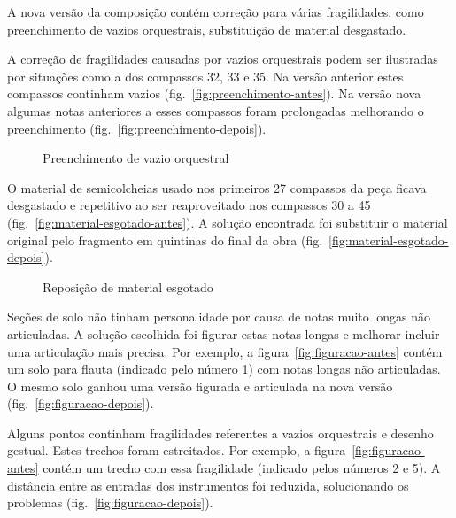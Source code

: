 \documentclass[10pt]{article}
\begin{document}
A nova versão da composição contém correção para várias fragilidades,
como preenchimento de vazios orquestrais, substituição de material
desgastado.

A correção de fragilidades causadas por vazios orquestrais podem ser
ilustradas por situações como a dos compassos 32, 33 e 35. Na versão
anterior estes compassos continham vazios
(fig.~\ref{fig:preenchimento-antes}). Na versão nova algumas notas
anteriores a esses compassos foram prolongadas melhorando o
preenchimento (fig.~\ref{fig:preenchimento-depois}).

\begin{figure*}
  \centering

  \caption{Preenchimento de vazio orquestral}
  \label{fig:preenchimento-vazio-orquestral}
\end{figure*}

O material de semicolcheias usado nos primeiros 27 compassos da peça
ficava desgastado e repetitivo ao ser reaproveitado nos compassos 30 a
45 (fig.~\ref{fig:material-esgotado-antes}). A solução encontrada foi
substituir o material original pelo fragmento em quintinas do final da
obra (fig.~\ref{fig:material-esgotado-depois}).

\begin{figure*}
  \centering

  \caption{Reposição de material esgotado}
  \label{fig:reposicao-material-esgotado}
\end{figure*}

Seções de solo não tinham personalidade por causa de notas muito
longas não articuladas. A solução escolhida foi figurar estas notas
longas e melhorar incluir uma articulação mais precisa. Por exemplo, a
figura~\ref{fig:figuracao-antes} contém um solo para flauta (indicado
pelo número 1) com notas longas não articuladas. O mesmo solo ganhou
uma versão figurada e articulada na nova versão
(fig.~\ref{fig:figuracao-depois}).

Alguns pontos continham fragilidades referentes a vazios orquestrais e
desenho gestual. Estes trechos foram estreitados. Por exemplo, a
figura~\ref{fig:figuracao-antes} contém um trecho com essa fragilidade
(indicado pelos números 2 e 5). A distância entre as entradas dos
instrumentos foi reduzida, solucionando os problemas
(fig.~\ref{fig:figuracao-depois}).
\end{document}

